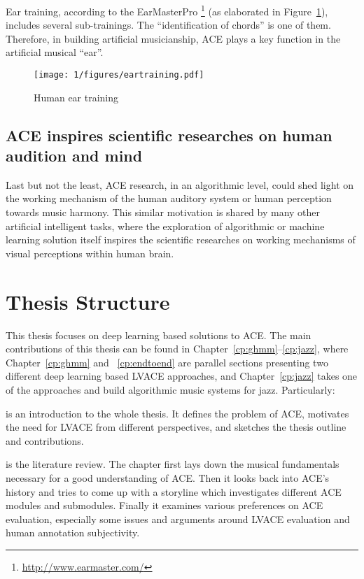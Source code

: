 Ear training, according to the EarMasterPro \footnote{\url{http://www.earmaster.com/}} (as elaborated in Figure~\ref{fig:1-eartraining}), includes several sub-trainings. The ``identification of chords'' is one of them. Therefore, in building artificial musicianship, ACE plays a key function in the artificial musical ``ear''.
\begin{figure}
\centering
\texttt{[image: 1/figures/eartraining.pdf]}
\caption{Human ear training}
\label{fig:1-eartraining}
\end{figure}

\subsection{ACE inspires scientific researches on human audition and mind}
Last but not the least, ACE research, in an algorithmic level, could shed light on the working mechanism of the human auditory system or human perception towards music harmony. This similar motivation is shared by many other artificial intelligent tasks\cite{lecun1995convolutional,hinton1995wake}, where the exploration of algorithmic or machine learning solution itself inspires the scientific researches on working mechanisms of visual perceptions within human brain.

\section{Thesis Structure} \label{sec:1-outline}
This thesis focuses on deep learning based solutions to ACE. The main contributions of this thesis can be found in Chapter~\ref{cp:ghmm}--\ref{cp:jazz}, where Chapter~\ref{cp:ghmm} and ~\ref{cp:endtoend} are parallel sections presenting two different deep learning based LVACE approaches, and Chapter~\ref{cp:jazz} takes one of the approaches and build algorithmic music systems for jazz. Particularly:

 is an introduction to the whole thesis. It defines the problem of ACE, motivates the need for LVACE from different perspectives, and sketches the thesis outline and contributions.

 is the literature review. The chapter first lays down the musical fundamentals necessary for a good understanding of ACE. Then it looks back into ACE's history and tries to come up with a storyline which investigates different ACE modules and submodules. Finally it examines various preferences on ACE evaluation, especially some issues and arguments around LVACE evaluation and human annotation subjectivity.

